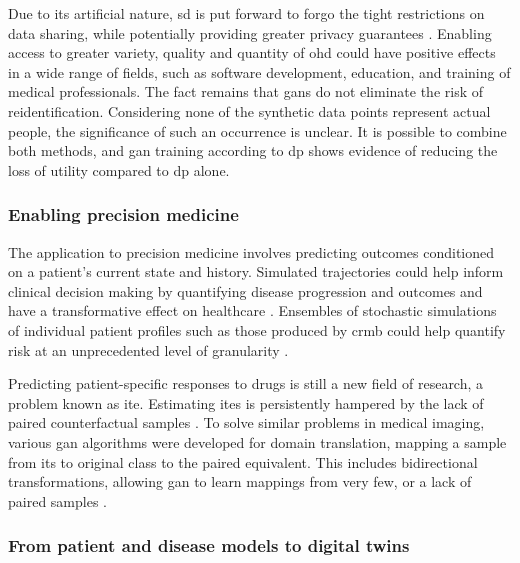             Due to its artificial nature, \gls{sd} is put forward to forgo the tight restrictions on data sharing, while potentially providing greater privacy guarantees \cite{Beaulieu-Jones2019-ct, baowaly_2019_IEEE, baowaly_2019_jamia,esteban2017real,Fisher2019,walsh2020generating, chin2019generation}. Enabling access to greater variety, quality and quantity of \gls{ohd} could have positive effects in a wide range of fields, such as software development, education, and training of medical professionals. The fact remains that \glspl{gan} do not eliminate the risk of reidentification. Considering none of the synthetic data points represent actual people, the significance of such an occurrence is unclear. It is possible to combine both methods, and \gls{gan} training according to \gls{dp} shows evidence of reducing the loss of utility compared to \gls{dp} alone.
    
        \subsubsection{Enabling precision medicine}\label{sec:precision_med}
    
            The application to precision medicine involves predicting outcomes conditioned on a patient's current state and history. Simulated trajectories could help inform clinical decision making by quantifying disease progression and outcomes and have a transformative effect on healthcare \cite{walsh2020generating, Fisher2019}. Ensembles of stochastic simulations of individual patient profiles such as those produced by \gls{crmb} could help quantify risk at an unprecedented level of granularity \cite{Fisher2019}.\par
            Predicting patient-specific responses to drugs is still a new field of research, a problem known as \gls{ite}. Estimating \glspl{ite} is persistently hampered by the lack of paired counterfactual samples \cite{Yoon2018-ite, chu2019treatment}. To solve similar problems in medical imaging, various \gls{gan} algorithms were developed for domain translation, mapping a sample from its to original class to the paired equivalent. This includes bidirectional transformations, allowing \gls{gan} to learn mappings from very few, or a lack of paired samples \cite{Wolterink2017DeepMT, CycleGAN2017, mcdermott2018semi}.
    
        \subsubsection{From patient and disease models to digital twins}\label{sec:models_twins}
    
